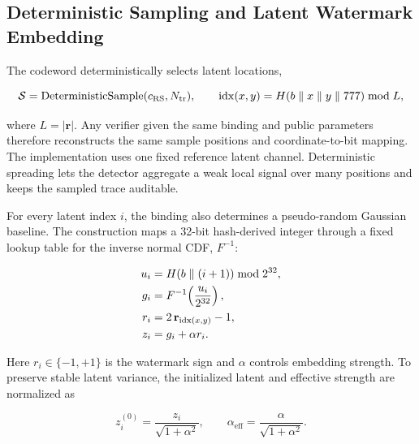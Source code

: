 \subsection{Deterministic Sampling and Latent Watermark Embedding}
\label{subsec:ch4-sampling-embedding}

The codeword deterministically selects \PPSampleCount{} latent locations,

\begin{equation}
    \mathcal{S}
        =\operatorname{DeterministicSample}
          (c_{\mathrm{RS}},N_{\mathrm{tr}}),
    \qquad
    \operatorname{idx}(x,y)
        =H(b\parallel x\parallel y\parallel777)\bmod L,
\label{eq:ch4-deterministic-sampling}
\end{equation}

where $L=|\mathbf r|$.  Any verifier given the same binding and public parameters
therefore reconstructs the same sample positions and coordinate-to-bit mapping.
The implementation uses one fixed reference latent channel.  Deterministic
spreading lets the detector aggregate a weak local signal over many positions and
keeps the sampled trace auditable.

For every latent index $i$, the binding also determines a pseudo-random Gaussian
baseline.  The construction maps a 32-bit hash-derived integer through a fixed
lookup table for the inverse normal CDF, $F^{-1}$:

\begin{equation}
\begin{aligned}
    u_i
        &=H(b\parallel(i+1))\bmod2^{32},\\
    g_i
        &=F^{-1}\!\left(\frac{u_i}{2^{32}}\right),\\
    r_i
        &=2\,\mathbf r_{\operatorname{idx}(x,y)}-1,\\
    z_i
        &=g_i+\alpha r_i.
\end{aligned}
\label{eq:ch4-latent-embedding}
\end{equation}

Here $r_i\in\{-1,+1\}$ is the watermark sign and \(\alpha\) controls embedding
strength.  To preserve stable latent variance, the initialized latent and effective
strength are normalized as

\begin{equation}
    z_i^{(0)}=\frac{z_i}{\sqrt{1+\alpha^2}},
    \qquad
    \alpha_{\mathrm{eff}}
        =\frac{\alpha}{\sqrt{1+\alpha^2}}.
\label{eq:ch4-latent-normalization}
\end{equation}

